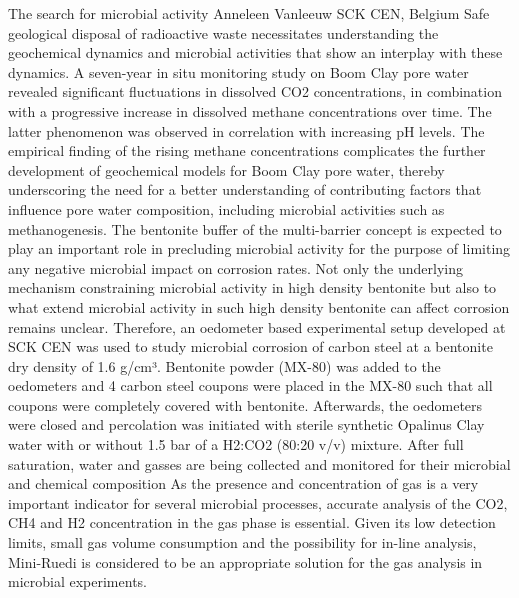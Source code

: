 \begin{conf-abstract}
{The search for microbial activity}
{Anneleen Vanleeuw}
{SCK CEN, Belgium}
{Safe geological disposal of radioactive waste necessitates understanding the geochemical dynamics and microbial activities that show an interplay with these dynamics. A seven-year in situ monitoring study on Boom Clay pore water revealed significant fluctuations in dissolved CO2 concentrations, in combination with a progressive increase in dissolved methane concentrations over time. The latter phenomenon was observed in correlation with increasing pH levels. The empirical finding of the rising methane concentrations complicates the further development of geochemical models for Boom Clay pore water, thereby underscoring the need for a better understanding of contributing factors that influence pore water composition, including microbial activities such as methanogenesis. 
The bentonite buffer of the multi-barrier concept is expected to play an important role in precluding microbial activity for the purpose of limiting any negative microbial impact on corrosion rates. Not only the underlying mechanism constraining microbial activity in high density bentonite but also to what extend microbial activity in such high density bentonite can affect corrosion remains unclear. Therefore, an oedometer based experimental setup developed at SCK CEN was used to study microbial corrosion of carbon steel at a bentonite dry density of 1.6 g/cm³. Bentonite powder (MX-80) was added to the oedometers and 4 carbon steel coupons were placed in the MX-80 such that all coupons were completely covered with bentonite. Afterwards, the oedometers were closed and percolation was initiated with sterile synthetic Opalinus Clay water with or without 1.5 bar of a H2:CO2 (80:20 v/v) mixture. After full saturation, water and gasses are being collected and monitored for their microbial and chemical composition 
As the presence and concentration of gas is a very important indicator for several microbial processes, accurate analysis of the CO2, CH4 and H2 concentration in the gas phase is essential. Given its low detection limits, small gas volume consumption and the possibility for in-line analysis, Mini-Ruedi is considered to be an appropriate solution for the gas analysis in microbial experiments.}
\end{conf-abstract}
